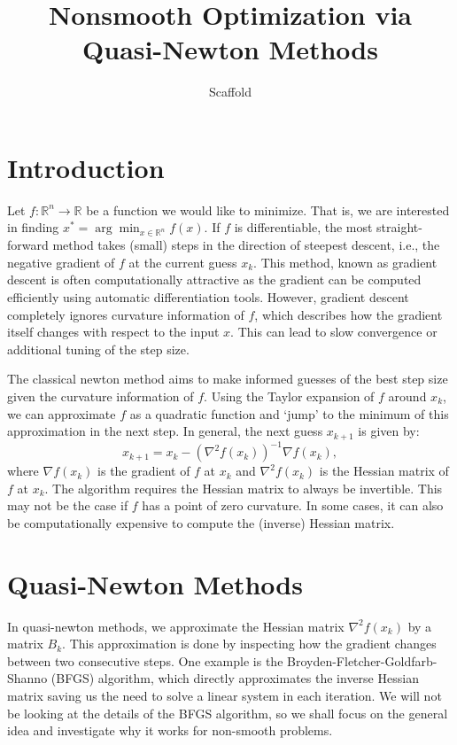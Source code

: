 \documentclass{article}
\title{Nonsmooth Optimization via Quasi-Newton Methods}
\author{Scaffold}
\begin{document}
\maketitle

\section{Introduction}

Let $f: \mathbb{R}^n \rightarrow \mathbb{R}$
be a function we would like to minimize.
That is, we are interested in finding
$x^* = \arg\min_{x \in \mathbb{R}^n} f(x)$.
If $f$ is differentiable, the most straight-forward
method takes (small) steps in the direction
of steepest descent, i.e., the negative
gradient of $f$ at the current guess $x_k$.
This method, known as gradient descent is
often computationally attractive as the gradient
can be computed efficiently using automatic
differentiation tools.
However, gradient descent completely ignores
curvature information of $f$, which describes
how the gradient itself changes with respect
to the input $x$.
This can lead to slow convergence or additional
tuning of the step size.

The classical newton method aims to make informed
guesses of the best step size given the curvature
information of $f$.
Using the Taylor expansion of $f$ around $x_k$,
we can approximate $f$ as a quadratic function
and `jump' to the minimum of this approximation
in the next step.
In general, the next guess $x_{k+1}$ is given by:
\begin{equation}
    x_{k+1} = x_k - (\nabla^2 f(x_k))^{-1} \nabla f(x_k),
\end{equation}
where $\nabla f(x_k)$ is the gradient of $f$ at $x_k$
and $\nabla^2 f(x_k)$ is the Hessian matrix of $f$ at $x_k$.
The algorithm requires the Hessian matrix to always be invertible.
This may not be the case if $f$ has a point of zero
curvature.
In some cases, it can also be computationally expensive
to compute the (inverse) Hessian matrix.

\section{Quasi-Newton Methods}

In quasi-newton methods, we approximate the Hessian
matrix $\nabla^2 f(x_k)$ by a matrix $B_k$.
This approximation is done by inspecting how the
gradient changes between two consecutive steps.
One example is the Broyden-Fletcher-Goldfarb-Shanno (BFGS)
algorithm, which directly approximates the inverse
Hessian matrix saving us the need to solve a linear
system in each iteration.
We will not be looking at the details of the BFGS
algorithm, so we shall focus on the general idea
and investigate why it works for non-smooth problems.
\end{document}
